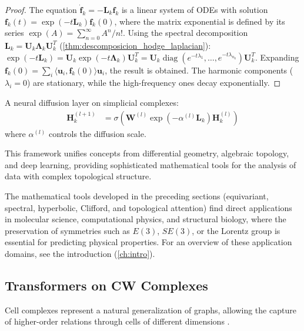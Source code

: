 \begin{proof}
The equation $\dot{\mathbf{f}}_k = -\mathbf{L}_k \mathbf{f}_k$ is a linear system of ODEs with solution $\mathbf{f}_k(t) = \exp(-t\mathbf{L}_k) \mathbf{f}_k(0)$, where the matrix exponential is defined by its series $\exp(A) = \sum_{n=0}^\infty A^n/n!$. Using the spectral decomposition $\mathbf{L}_k = \mathbf{U}_k \boldsymbol{\Lambda}_k \mathbf{U}_k^T$ (\autoref{thm:descomposicion_hodge_laplacian}): $\exp(-t\mathbf{L}_k) = \mathbf{U}_k \exp(-t\boldsymbol{\Lambda}_k) \mathbf{U}_k^T = \mathbf{U}_k \operatorname{diag}(e^{-t\lambda_1}, \ldots, e^{-t\lambda_{n_k}}) \mathbf{U}_k^T$. Expanding $\mathbf{f}_k(0) = \sum_i \langle \mathbf{u}_i, \mathbf{f}_k(0)\rangle \mathbf{u}_i$, the result is obtained. The harmonic components ($\lambda_i = 0$) are stationary, while the high-frequency ones decay exponentially.
\end{proof}

\begin{definition}\label{def:neural_diffusion_complejos}
A neural diffusion layer on simplicial complexes:
\begin{align}
    \mathbf{H}_k^{(l+1)} &= \sigma\left(\mathbf{W}^{(l)} \exp(-\alpha^{(l)} \mathbf{L}_k) \mathbf{H}_k^{(l)}\right)
\end{align}
where $\alpha^{(l)}$ controls the diffusion scale.
\end{definition}

This framework unifies concepts from differential geometry, algebraic topology, and deep learning, providing sophisticated mathematical tools for the analysis of data with complex topological structure.

The mathematical tools developed in the preceding sections (equivariant, spectral, hyperbolic, Clifford, and topological attention) find direct applications in molecular science, computational physics, and structural biology, where the preservation of symmetries such as $E(3)$, $SE(3)$, or the Lorentz group is essential for predicting physical properties. For an overview of these application domains, see the introduction (\autoref{ch:intro}).

\subsection[Transformers on CW Complexes]{\glspl{Transformer} on CW Complexes}

Cell complexes represent a natural generalization of graphs, allowing the capture of higher-order relations through cells of different dimensions \citep{bodnar2021cell}.

